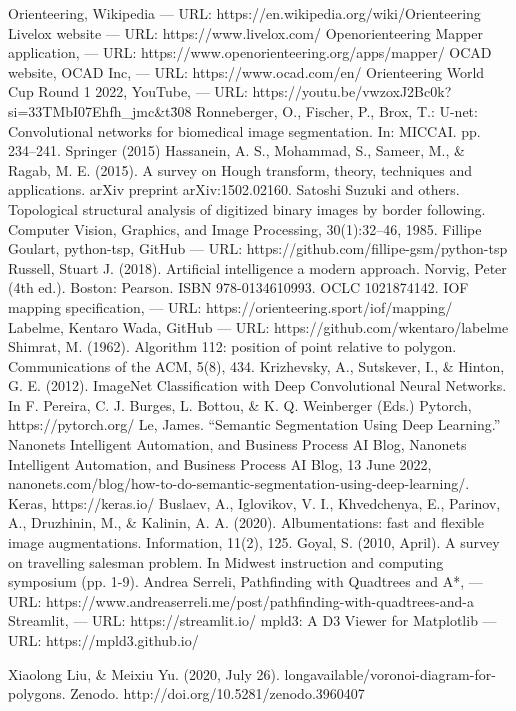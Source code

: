 \documentclass[a4paper,12pt]{extarticle}
\begin{document}
\newpage
\begin{thebibliography}{00}
 Orienteering, Wikipedia --- URL: https://en.wikipedia.org/wiki/Orienteering 
 Livelox website --- URL: https://www.livelox.com/
 Openorienteering Mapper application, --- URL: https://www.openorienteering.org/apps/mapper/ 
 OCAD website, OCAD Inc, --- URL: https://www.ocad.com/en/ 
 Orienteering World Cup Round 1 2022, YouTube, --- URL: https://youtu.be/vwzoxJ2Bc0k?si=33TMbI07Ehfh\_jmc\&t\=308
 Ronneberger, O., Fischer, P., Brox, T.: U-net: Convolutional networks for biomedical image segmentation. In: MICCAI. pp. 234–241. Springer (2015) 
 Hassanein, A. S., Mohammad, S., Sameer, M., \& Ragab, M. E. (2015). A survey on Hough transform, theory, techniques and applications. arXiv preprint arXiv:1502.02160.
 Satoshi Suzuki and others. Topological structural analysis of digitized binary images by border following. Computer Vision, Graphics, and Image Processing, 30(1):32–46, 1985. 
 Fillipe Goulart, python-tsp, GitHub --- URL: https://github.com/fillipe-gsm/python-tsp
 Russell, Stuart J. (2018). Artificial intelligence a modern approach. Norvig, Peter (4th ed.). Boston: Pearson. ISBN 978-0134610993. OCLC 1021874142.
 IOF mapping specification, --- URL: https://orienteering.sport/iof/mapping/
 Labelme, Kentaro Wada, GitHub --- URL: https://github.com/wkentaro/labelme 
 Shimrat, M. (1962). Algorithm 112: position of point relative to polygon. Communications of the ACM, 5(8), 434.
 Krizhevsky, A., Sutskever, I., \& Hinton, G. E. (2012). ImageNet Classification with Deep Convolutional Neural Networks. In F. Pereira, C. J. Burges, L. Bottou, \& K. Q. Weinberger (Eds.)
 Pytorch, https://pytorch.org/
 Le, James. “Semantic Segmentation Using Deep Learning.” Nanonets Intelligent Automation, and Business Process AI Blog, Nanonets Intelligent Automation, and Business Process AI Blog, 13 June 2022, nanonets.com/blog/how-to-do-semantic-segmentation-using-deep-learning/.
 Keras, https://keras.io/
 Buslaev, A., Iglovikov, V. I., Khvedchenya, E., Parinov, A., Druzhinin, M., \& Kalinin, A. A. (2020). Albumentations: fast and flexible image augmentations. Information, 11(2), 125. 
 Goyal, S. (2010, April). A survey on travelling salesman problem. In Midwest instruction and computing symposium (pp. 1-9).
 Andrea Serreli, Pathfinding with Quadtrees and A*, --- URL: https://www.andreaserreli.me/post/pathfinding-with-quadtrees-and-a
 Streamlit, --- URL: https://streamlit.io/
 mpld3: A D3 Viewer for Matplotlib --- URL: https://mpld3.github.io/

 Xiaolong Liu, \& Meixiu Yu. (2020, July 26). longavailable/voronoi-diagram-for-polygons. Zenodo. http://doi.org/10.5281/zenodo.3960407

\end{thebibliography}
	
\end{document}
